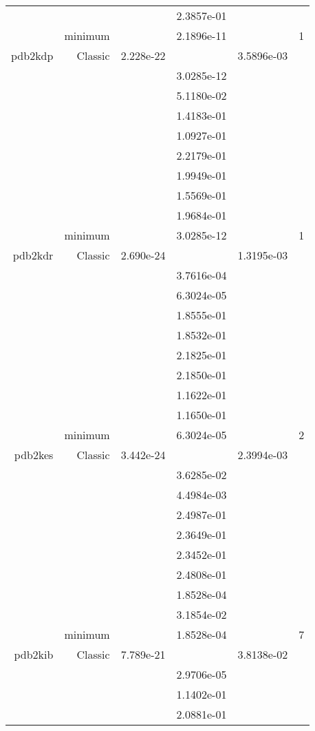 \begin{xltabular}{\textwidth}{r|rS[table-format=1.3e+2]S[table-format=1.4e+2]S[table-format=1.4e+2]S[table-format=-1.5]}
&  &  & 2.3857e-01 & & \\
& minimum &  & 2.1896e-11 & & 1 \\  \addlinespace
pdb2kdp & Classic & 2.228e-22 &  & 3.5896e-03 & \\
&  &  & 3.0285e-12 & & \\
&  &  & 5.1180e-02 & & \\
&  &  & 1.4183e-01 & & \\
&  &  & 1.0927e-01 & & \\
&  &  & 2.2179e-01 & & \\
&  &  & 1.9949e-01 & & \\
&  &  & 1.5569e-01 & & \\
&  &  & 1.9684e-01 & & \\
& minimum &  & 3.0285e-12 & & 1 \\  \addlinespace
pdb2kdr & Classic & 2.690e-24 &  & 1.3195e-03 & \\
&  &  & 3.7616e-04 & & \\
&  &  & 6.3024e-05 & & \\
&  &  & 1.8555e-01 & & \\
&  &  & 1.8532e-01 & & \\
&  &  & 2.1825e-01 & & \\
&  &  & 2.1850e-01 & & \\
&  &  & 1.1622e-01 & & \\
&  &  & 1.1650e-01 & & \\
& minimum &  & 6.3024e-05 & & 2 \\  \addlinespace
pdb2kes & Classic & 3.442e-24 &  & 2.3994e-03 & \\
&  &  & 3.6285e-02 & & \\
&  &  & 4.4984e-03 & & \\
&  &  & 2.4987e-01 & & \\
&  &  & 2.3649e-01 & & \\
&  &  & 2.3452e-01 & & \\
&  &  & 2.4808e-01 & & \\
&  &  & 1.8528e-04 & & \\
&  &  & 3.1854e-02 & & \\
& minimum &  & 1.8528e-04 & & 7 \\  \addlinespace
pdb2kib & Classic & 7.789e-21 &  & 3.8138e-02 & \\
&  &  & 2.9706e-05 & & \\
&  &  & 1.1402e-01 & & \\
&  &  & 2.0881e-01 & & \\

\end{xltabular}
